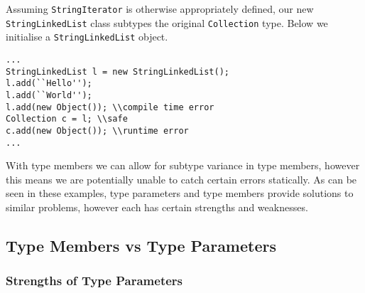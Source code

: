 \documentclass[11pt
              , a4paper
              , twoside
              , openright
              ]{report}
\numberwithin{case}{theorem}
\numberwithin{subcase}{case}
\begin{document}
Assuming \verb|StringIterator| is otherwise appropriately defined, our new \verb|StringLinkedList| class subtypes the original \verb|Collection| type. Below we initialise a \verb|StringLinkedList| object.
\begin{lstlisting}[mathescape, style=custom_lang]
...
StringLinkedList l = new StringLinkedList();
l.add(``Hello'');
l.add(``World'');
l.add(new Object()); \\compile time error
Collection c = l; \\safe
c.add(new Object()); \\runtime error
...
\end{lstlisting}
With type members we can allow for subtype variance in type members, however this means we are potentially unable to catch certain errors statically. As can be seen in these examples, type parameters and type members provide solutions to similar problems, however each has certain strengths and weaknesses.

\subsection{Type Members vs Type Parameters}
\subsubsection{Strengths of Type Parameters}
\end{document}

